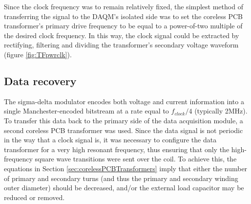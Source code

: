 \documentclass[conference]{IEEEtran}
\begin{document}
	Since the clock frequency was to remain relatively fixed, the simplest method of transferring the signal to the DAQM's isolated side was to set the coreless PCB transformer's primary drive frequency to be equal to a power-of-two multiple of the desired clock frequency.  In this way, the clock signal could be extracted by rectifying, filtering and dividing the transformer's secondary voltage waveform (figure \ref{fig:TFpwrclk}).
	
	\subsection{Data recovery}
	The sigma-delta modulator encodes both voltage and current information into a single Manchester-encoded bitstream at a rate equal to $ f_{clock}/4 $ (typically 2MHz).  To transfer this data back to the primary side of the data acquisition module, a second coreless PCB transformer was used.  Since the data signal is not periodic in the way that a clock signal is, it was necessary to configure the data transformer for a very high resonant frequency, thus ensuring that only the high-frequency square wave transitions were sent over the coil.  To achieve this, the equations in Section \ref{sec:corelessPCBTransformers} imply that either the number of primary and secondary turns (and thus the primary and secondary winding outer diameter) should be decreased, and/or the external load capacitor may be reduced or removed.
	
\end{document}
